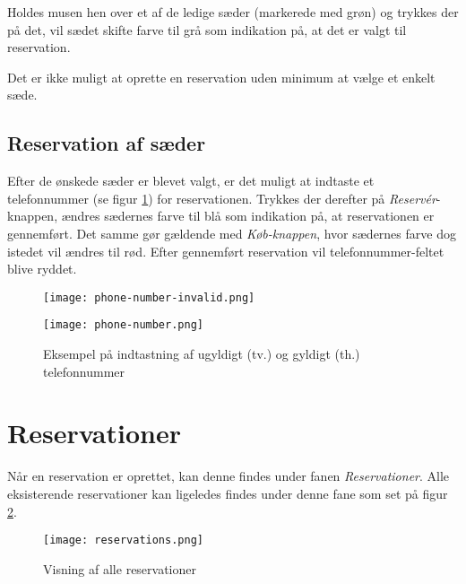 Holdes musen hen over et af de ledige sæder (markerede med grøn) og trykkes der på det, vil sædet skifte farve til grå som indikation på, at det er valgt til reservation.

Det er ikke muligt at oprette en reservation uden minimum at vælge et enkelt sæde.

\subsection{Reservation af sæder}

Efter de ønskede sæder er blevet valgt, er det muligt at indtaste et telefonnummer (se figur \ref{screenshot:phone-number}) for reservationen. Trykkes der derefter på \textit{Reservér}-knappen, ændres sædernes farve til blå som indikation på, at reservationen er gennemført. Det samme gør gældende med \textit{Køb-knappen}, hvor sædernes farve dog istedet vil ændres til rød. Efter gennemført reservation vil telefonnummer-feltet blive ryddet.

\begin{figure}[h]
  \centering
  \begin{minipage}[b]{0.4\linewidth}
    \centering
    \texttt{[image: phone-number-invalid.png]}
  \end{minipage}
  \hspace{0.5cm}
  \begin{minipage}[b]{0.4\linewidth}
    \centering
    \texttt{[image: phone-number.png]}
  \end{minipage}

  \caption{Eksempel på indtastning af ugyldigt (tv.) og gyldigt (th.) telefonnummer}
  \label{screenshot:phone-number}
\end{figure}

\section{Reservationer}

Når en reservation er oprettet, kan denne findes under fanen \textit{Reservationer}. Alle eksisterende reservationer kan ligeledes findes under denne fane som set på figur \ref{screenshot:all-reservations}.

\begin{figure}[h]
  \centering
  \texttt{[image: reservations.png]}
  \caption{Visning af alle reservationer}
  \label{screenshot:all-reservations}
\end{figure}

